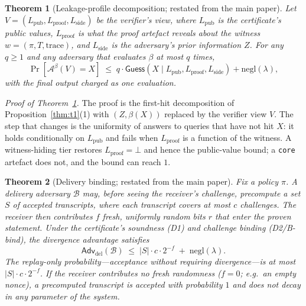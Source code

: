 \documentclass[10pt,journal,compsoc]{IEEEtran}
\newtheorem{theorem}{Theorem}
\begin{document}
\begin{theorem}[Leakage-profile decomposition; restated from the main paper]
\label{thm:leak}
Let $V=(L_{\mathrm{pub}},L_{\mathrm{proof}},L_{\mathrm{side}})$ be the verifier's
view, where $L_{\mathrm{pub}}$ is the certificate's public values,
$L_{\mathrm{proof}}$ is what the proof artefact reveals about the witness
$w=(\pi,T,\mathrm{trace})$, and $L_{\mathrm{side}}$ is the adversary's prior
information $Z$. For any $q\ge 1$ and any adversary that evaluates $\beta$ at
most $q$ times,
\[
\Pr\!\left[\mathcal{A}^\beta(V)=X\right]
\;\le\; q\cdot\mathsf{Guess}\!\left(X\mid L_{\mathrm{pub}},L_{\mathrm{proof}},L_{\mathrm{side}}\right)
+\mathrm{negl}(\lambda),
\]
with the final output charged as one evaluation.
\end{theorem}

\noindent\emph{Proof of Theorem~\ref{thm:leak}.} The proof is the first-hit
decomposition of Proposition~\ref{thm:t1}(1) with $(Z,\beta(X))$ replaced by the
verifier view $V$. The step that changes is the uniformity of answers to queries
that have not hit $X$: it holds conditionally on $L_{\mathrm{pub}}$ and fails when
$L_{\mathrm{proof}}$ is a function of the witness. A witness-hiding tier restores
$L_{\mathrm{proof}}=\bot$ and hence the public-value bound; a \texttt{core}
artefact does not, and the bound can reach $1$.

\begin{theorem}[Delivery binding; restated from the main paper]
\label{thm:t3}
Fix a policy $\pi$. A delivery adversary $\mathcal{B}$ may, \emph{before}
seeing the receiver's challenge, precompute a set $S$ of accepted transcripts,
where each transcript covers at most $c$ challenges. The receiver then
contributes $f$ fresh, uniformly random bits $r$ that enter the proven
statement. Under the certificate's soundness (D1) and challenge binding
(D2/B-bind), the divergence advantage satisfies
\[
\mathsf{Adv}_{\mathrm{del}}(\mathcal{B}) \;\le\; |S| \cdot c \cdot 2^{-f}
\;+\; \mathrm{negl}(\lambda).
\]
The replay-only probability---acceptance without requiring divergence---is at
most $|S|\cdot c\cdot 2^{-f}$. If the receiver contributes no fresh randomness
($f = 0$; e.g.\ an empty nonce), a precomputed transcript is accepted with
probability $1$ and \emph{does not decay in any parameter of the system}.
\end{theorem}
\end{document}

